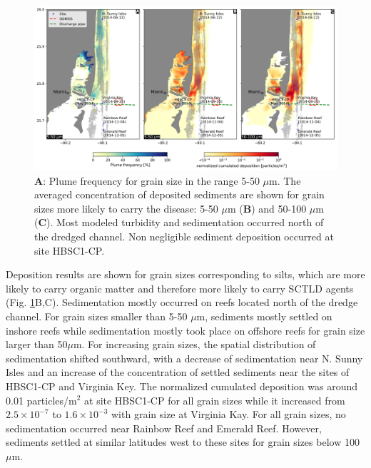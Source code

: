 \documentclass[preprint,12pt,authoryear]{elsarticle}
\begin{document}
\begin{figure}
    \centering
    \includegraphics[width=\textwidth]{figures/deposition_plumes.png}
    \caption{\textbf{A}: Plume frequency for grain size in the range 5-50 $\mu$m. The averaged concentration of deposited sediments are shown for grain sizes more likely to carry the disease: 5-50 $\mu$m (\textbf{B}) and 50-100 $\mu$m (\textbf{C}). Most modeled turbidity and sedimentation occurred north of the dredged channel. Non negligible sediment deposition occurred at site HBSC1-CP.}
    \label{fig:onset_depo}    
\end{figure}

Deposition results are shown for grain sizes corresponding to silts, which are more likely to carry organic matter and therefore more likely to carry SCTLD agents (Fig. \ref{fig:onset_depo}B,C). Sedimentation mostly occurred on reefs located north of the dredge channel. For grain sizes smaller than 5-50 $\mu$m, sediments mostly settled on inshore reefs while sedimentation mostly took place on offshore reefs for grain size larger than 50$\mu$m. For increasing grain sizes, the spatial distribution of sedimentation shifted southward, with a decrease of sedimentation near N. Sunny Isles and an increase of the concentration of settled sediments near the sites of HBSC1-CP and Virginia Key. The normalized cumulated deposition was around 0.01 particles/m$^2$ at site HBSC1-CP for all grain sizes while it increased from $2.5\times 10^{-7}$ to $1.6\times 10^{-3}$ with grain size at Virginia Kay. For all grain sizes, no sedimentation occurred near Rainbow Reef and Emerald Reef. However, sediments settled at similar latitudes west to these sites for grain sizes below 100 $\mu$m.
\end{document}
